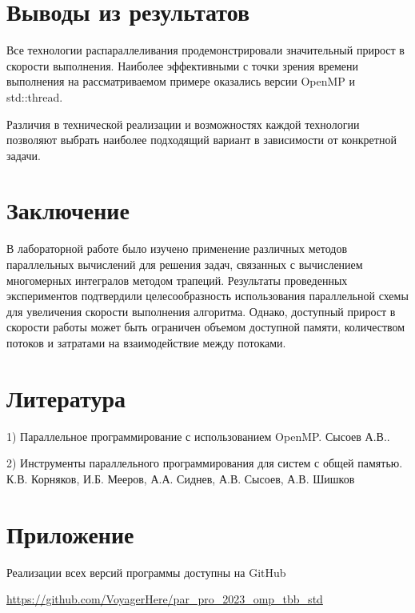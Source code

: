 \documentclass[14pt, a4paper]{extarticle}
\begin{document}
\section*{Выводы из результатов}
Все технологии распараллеливания продемонстрировали значительный прирост в скорости выполнения. Наиболее эффективными с точки зрения времени выполнения на рассматриваемом примере оказались версии OpenMP и std::thread. 

Различия в технической реализации и возможностях каждой технологии позволяют выбрать наиболее подходящий вариант в зависимости от конкретной задачи. 

\section*{Заключение}

В лабораторной работе было изучено применение различных методов параллельных вычислений для решения задач, связанных с вычислением многомерных интегралов методом трапеций. Результаты проведенных экспериментов подтвердили целесообразность использования параллельной схемы для увеличения скорости выполнения алгоритма. Однако, доступный прирост в скорости работы может быть ограничен объемом доступной памяти, количеством потоков и затратами на взаимодействие между потоками.

\section*{Литература}

1) Параллельное программирование с использованием OpenMP. Сысоев А.В..

2) Инструменты параллельного программирования для систем с общей памятью. К.В. Корняков, И.Б. Мееров, А.А. Сиднев, А.В. Сысоев, А.В. Шишков

\section*{Приложение}
Реализации всех версий программы доступны на GitHub

\url{https://github.com/VoyagerHere/par_pro_2023_omp_tbb_std}
\end{document}
